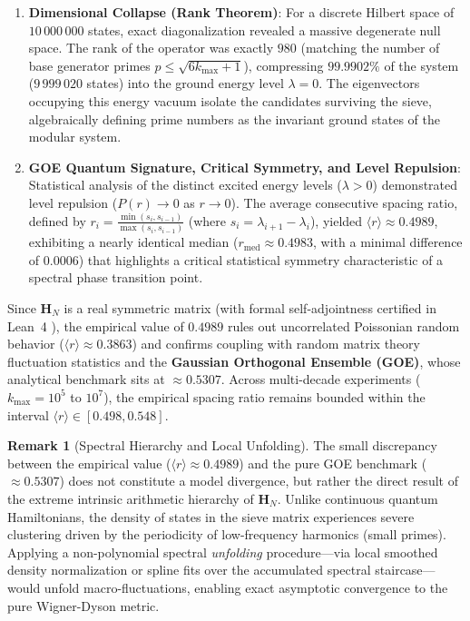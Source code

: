 \documentclass{article}
\numberwithin{equation}{section}
\theoremstyle{plain}
\theoremstyle{definition}
\newtheorem{remark}[theorem]{Remark}
\begin{document}
\begin{enumerate}
    \item \textbf{Dimensional Collapse (Rank Theorem)}: For a discrete Hilbert space of $10\,000\,000$ states, exact diagonalization revealed a massive degenerate null space. The rank of the operator was exactly $980$ (matching the number of base generator primes $p \le \sqrt{6k_{\max}+1}$), compressing $99.9902\%$ of the system ($9\,999\,020$ states) into the ground energy level $\lambda = 0$. The eigenvectors occupying this energy vacuum isolate the candidates surviving the sieve, algebraically defining prime numbers as the invariant ground states of the modular system.
    
    \item \textbf{GOE Quantum Signature, Critical Symmetry, and Level Repulsion}: Statistical analysis of the distinct excited energy levels ($\lambda > 0$) demonstrated level repulsion ($P(r) \to 0$ as $r \to 0$). The average consecutive spacing ratio, defined by $r_i = \frac{\min(s_i, s_{i-1})}{\max(s_i, s_{i-1})}$ (where $s_i = \lambda_{i+1} - \lambda_i$), yielded $\langle r \rangle \approx 0.4989$, exhibiting a nearly identical median ($r_{\text{med}} \approx 0.4983$, with a minimal difference of $0.0006$) that highlights a critical statistical symmetry characteristic of a spectral phase transition point.
\end{enumerate}

Since $\mathbf{H}_N$ is a real symmetric matrix (with formal self-adjointness certified in Lean~4 \cite{Lean4}), the empirical value of $0.4989$ rules out uncorrelated Poissonian random behavior ($\langle r \rangle \approx 0.3863$) and confirms coupling with random matrix theory fluctuation statistics \cite{Mehta2004} and the \textbf{Gaussian Orthogonal Ensemble (GOE)}, whose analytical benchmark sits at $\approx 0.5307$. Across multi-decade experiments ($k_{\max} = 10^5$ to $10^7$), the empirical spacing ratio remains bounded within the interval $\langle r \rangle \in [0.498, 0.548]$.

\begin{remark}[Spectral Hierarchy and Local Unfolding]
\label{rem:unfolding-espectral}
The small discrepancy between the empirical value ($\langle r \rangle \approx 0.4989$) and the pure GOE benchmark ($\approx 0.5307$) does not constitute a model divergence, but rather the direct result of the extreme intrinsic arithmetic hierarchy of $\mathbf{H}_N$. Unlike continuous quantum Hamiltonians, the density of states in the sieve matrix experiences severe clustering driven by the periodicity of low-frequency harmonics (small primes). Applying a non-polynomial spectral \textit{unfolding} procedure—via local smoothed density normalization or spline fits over the accumulated spectral staircase—would unfold macro-fluctuations, enabling exact asymptotic convergence to the pure Wigner-Dyson metric.
\end{remark}
\end{document}
